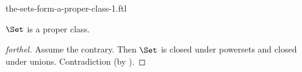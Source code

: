 \documentclass{naproche-library}
\begin{document}
\begin{smodule}[title=The Sets Form a Proper Class]{the-sets-form-a-proper-class-1.ftl}

\begin{proposition}[forthel,id=hilbert_paradox_corollary]
  $\Set$ is a proper class.
\end{proposition}
\begin{proof}[forthel]
  Assume the contrary.
  Then $\Set$ is closed under powersets and closed under unions.
  Contradiction (by ).
\end{proof}
\end{smodule}
\end{document}
